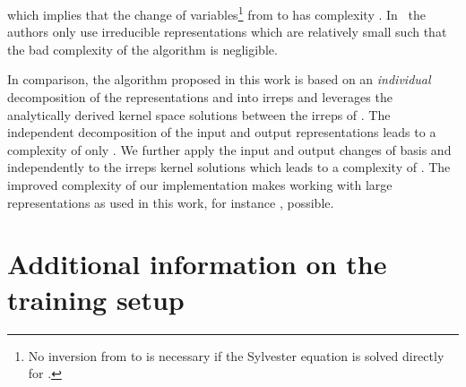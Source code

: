 \documentclass{article}
\begin{document}
{{which implies that the change of variables\footnote{No inversion from  to  is necessary if the Sylvester equation is solved directly for .}
from  to  has complexity .
In~\cite{3d_steerableCNNs} the authors only use irreducible representations which are relatively small such that the bad complexity of the algorithm is negligible.

In comparison, the algorithm proposed in this work is based on an \textit{individual} decomposition of the representations  and  into irreps and leverages the analytically derived kernel space solutions between the irreps of .
The independent decomposition of the input and output representations leads to a complexity of only
.
We further apply the input and output changes of basis  and  independently to the irreps kernel solutions  which leads to a complexity of 
.
The improved complexity of our implementation makes working with large representations as used in this work, for instance , possible.

 	
\section{Additional information on the training setup}
\label{apx:training_setup}

}}
\end{document}
